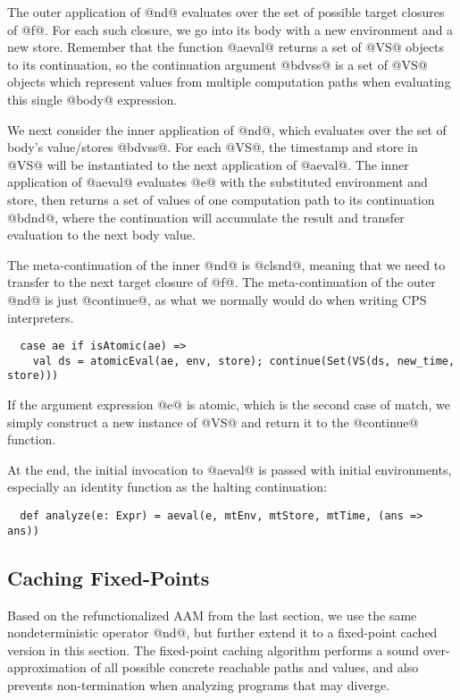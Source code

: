 \documentclass[acmsmall, review]{acmart}\settopmatter{}
\begin{document}
The outer application of @nd@ evaluates over the set of possible target closures of
@f@. For each such closure, we go into its body with a new environment and a new store.
Remember that the function @aeval@ returns a set of @VS@ objects to its continuation,
so the continuation argument @bdvss@ is a set of @VS@ objects which represent values
from multiple computation paths when evaluating this single @body@ expression.

We next consider the inner application of @nd@, which evaluates over the set of body's 
value/stores @bdvss@. For each @VS@, the timestamp and store in @VS@ will be instantiated to
the next application of @aeval@. The inner application of @aeval@ evaluates @e@ with the
substituted environment and store, then returns a set of values of one computation path 
to its continuation @bdnd@, where the continuation will accumulate the result and 
transfer evaluation to the next body value.

The meta-continuation of the inner @nd@ is @clsnd@, meaning that we need to transfer 
to the next target closure of @f@. The meta-continuation of the outer @nd@ is just 
@continue@, as what we normally would do when writing CPS interpreters.

\begin{lstlisting}
  case ae if isAtomic(ae) => 
    val ds = atomicEval(ae, env, store); continue(Set(VS(ds, new_time, store)))
\end{lstlisting}

If the argument expression @e@ is atomic, which is the second case of match, we simply 
construct a new instance of @VS@ and return it to the @continue@ function.

At the end, the initial invocation to @aeval@ is passed with initial environments,
especially an identity function as the halting continuation:
\begin{lstlisting}
  def analyze(e: Expr) = aeval(e, mtEnv, mtStore, mtTime, (ans => ans))
\end{lstlisting}

\subsection{Caching Fixed-Points}

Based on the refunctionalized AAM from the last section, we use the same nondeterministic
operator @nd@, but further extend it to a fixed-point cached version in this section.
The fixed-point caching algorithm performs a sound over-approximation of all possible
concrete reachable paths and values, and also prevents non-termination when analyzing 
programs that may diverge. \\
\end{document}
